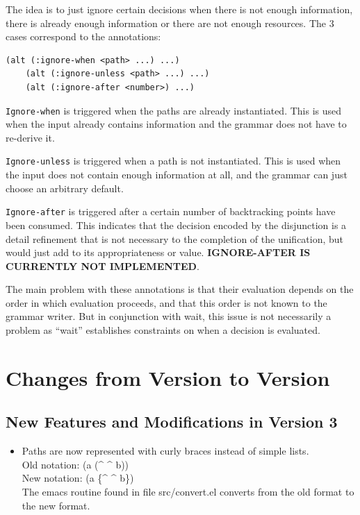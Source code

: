 \documentclass[10pt,a4paper]{report}
\begin{document}
\begin{appendices}
The idea is to just ignore certain decisions when there is not enough 
information, there is already enough information or there are not enough
resources.  The 3 cases correspond to the annotations:

\begin{lstlisting}[language=Lisp]
	(alt (:ignore-when <path> ...) ...)
	(alt (:ignore-unless <path> ...) ...)
	(alt (:ignore-after <number>) ...)
\end{lstlisting}

{\tt Ignore-when} is triggered when the paths are already instantiated.  
This is used when the input already contains information and the grammar
does not have to re-derive it.

{\tt Ignore-unless} is triggered when a path is not instantiated.
This is used when the input does not contain enough information at all, and
the grammar can just choose an arbitrary default.

{\tt Ignore-after} is triggered after a certain number of backtracking points
have been consumed.  This indicates that the decision encoded by the
disjunction is a detail refinement that is not necessary to the completion
of the unification, but would just add to its appropriateness or value.
{\bf IGNORE-AFTER IS CURRENTLY NOT IMPLEMENTED}.

The main problem with these annotations is that their evaluation depends on
the order in which evaluation proceeds, and that this order is not known to
the grammar writer.  But in conjunction with wait, this issue is not
necessarily a problem as ``wait'' establishes constraints on when a decision
is evaluated.


\chapter{Changes from Version to Version}

\section{New Features and Modifications in Version 3}

\begin{itemize}
\item Paths are now represented with curly braces instead of simple lists.
\\Old notation: (a (\^{} \^{} b))
\\New notation: (a \{\^{} \^{} b\})
\\The emacs routine found in file src/convert.el converts from the old format to the new format.


\end{itemize}
\end{appendices}
\end{document}
